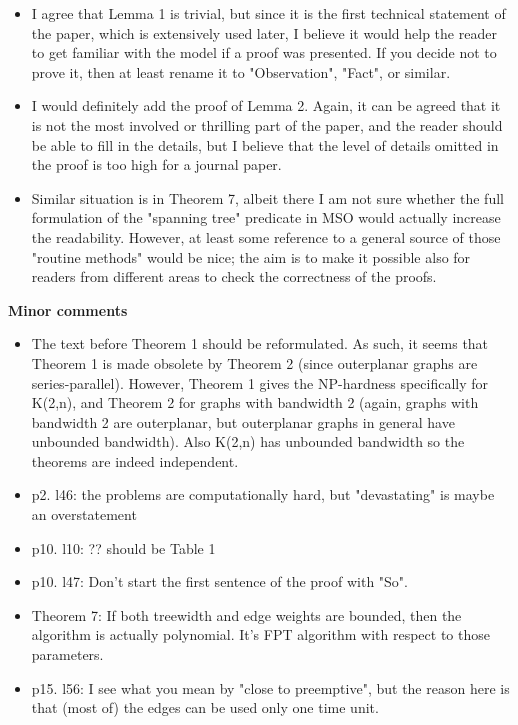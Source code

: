 \documentclass[11pt,a4paper]{article}
\begin{document}
\begin{itemize}

\item I agree that Lemma 1 is trivial, but since it is the first technical
  statement of the paper, which is extensively used later, I believe it would
  help the reader to get familiar with the model if a proof was presented. If
  you decide not to prove it, then at least rename it to "Observation", "Fact",
  or similar.

\item I would definitely add the proof of Lemma 2. Again, it can be agreed that it
  is not the most involved or thrilling part of the paper, and the reader
  should be able to fill in the details, but I believe that the level of
  details omitted in the proof is too high for a journal paper.

\item Similar situation is in Theorem 7, albeit there I am not sure whether the
  full formulation of the "spanning tree" predicate in MSO would actually
  increase the readability. However, at least some reference to a general
  source of those "routine methods" would be nice; the aim is to make it
  possible also for readers from different areas to check the correctness of
  the proofs.
 
\end{itemize}

\textbf{Minor comments}

\begin{itemize}

\item The text before Theorem 1 should be reformulated. As such, it seems that
Theorem 1 is made obsolete by Theorem 2 (since outerplanar graphs are
series-parallel).  However, Theorem 1 gives the NP-hardness specifically for
K(2,n), and Theorem 2 for graphs with bandwidth 2 (again, graphs with bandwidth
2 are outerplanar, but outerplanar graphs in general have unbounded bandwidth).
Also K(2,n) has unbounded bandwidth so the theorems are indeed independent.


\item p2.  l46: the problems are computationally hard, but "devastating" is maybe
            an overstatement
\item p10. l10: ?? should be Table 1
\item p10. l47: Don't start the first sentence of the proof with "So".
\item Theorem 7: If both treewidth and edge weights are bounded, then the algorithm
  is actually polynomial. It's FPT algorithm with respect to those parameters.
\item p15. l56: I see what you mean by "close to preemptive", but the reason here is 
  that (most of) the edges can be used only one time unit.
  
\end{itemize}
\end{document}
